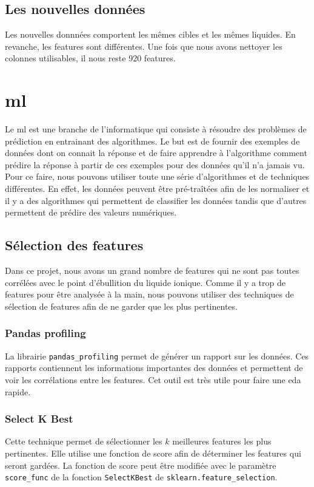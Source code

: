 \subsection{Les nouvelles données}
Les nouvelles donnnées comportent les mêmes cibles et les mêmes liquides.
En revanche, les features sont différentes.
Une fois que nous avons nettoyer les colonnes utilisables, il nous reste 920 features.


\section{\acrlong{ml}}
Le \acrfull{ml} est une branche de l'informatique qui consiste à résoudre des problèmes de prédiction en entrainant des algorithmes.
Le but est de fournir des exemples de données dont on connait la réponse et de faire apprendre à l'algorithme comment prédire la réponse à partir de ces exemples pour des données qu'il n'a jamais vu.
Pour ce faire, nous pouvons utiliser toute une série d'algorithmes et de techniques différentes.
En effet, les données peuvent être pré-traîtées afin de les normaliser et il y a des algorithmes qui permettent de classifier les données tandis que d'autres permettent de prédire des valeurs numériques.


\subsection{Sélection des features}
Dans ce projet, nous avons un grand nombre de features qui ne sont pas toutes corrélées avec le point d'ébullition du liquide ionique.
Comme il y a trop de features pour être analysée à la main, nous pouvons utiliser des techniques de sélection de features afin de ne garder que les plus pertinentes.

\subsubsection{Pandas profiling}
La librairie \texttt{pandas\_profiling} permet de générer un rapport sur les données.
Ces rapports contiennent les informations importantes des données et permettent de voir les corrélations entre les features.
Cet outil est très utile pour faire une \acrfull{eda} rapide.

\subsubsection{Select K Best}
Cette technique permet de sélectionner les $k$ meilleures features les plus pertinentes.
Elle utilise une fonction de score afin de déterminer les features qui seront gardées.
La fonction de score peut être modifiée avec le paramètre \texttt{score\_func} de la fonction \texttt{SelectKBest} de \texttt{sklearn.feature\_selection}.

